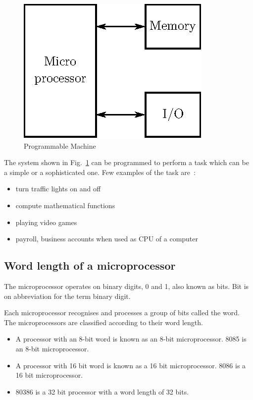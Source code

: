 \begin{figure}[H]
\centering
\includegraphics{chap7/fig7.1.eps}
\bigskip
\caption{Programmable Machine}\label{fig7.1}
\end{figure}

The system shown in Fig.~\ref{fig7.1} can be programmed to perform a task which can be a simple or a sophisticated one. Few examples of the task are~:
\begin{itemize}
\item turn traffic lights on and off

\item compute mathematical functions

\item playing video games

\item payroll, business accounts when used as CPU of a computer
\end{itemize}

\subsection{Word length of a microprocessor}\label{sec7.1.1}

The microprocessor operates on binary digits, 0 and 1, also known as bits. Bit is on abbreviation for the term binary digit.

Each microprocessor recognises and processes a group of bits called the word. The microprocessors are classified according to their word length.
\begin{itemize}
\item A processor with an $8$-bit word is known as an $8$-bit microprocessor. 8085 is an $8$-bit microprocessor.

\item A processor with 16 bit word is known as a 16 bit microprocessor. 8086 is a 16 bit microprocessor.

\item 80386 is a 32 bit processor with a word length of 32 bits.
\end{itemize}

